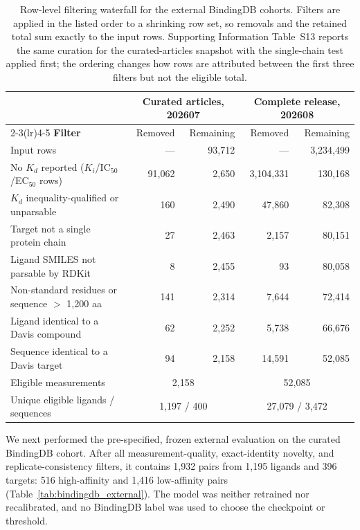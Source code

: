 \documentclass[fleqn,10pt]{wlscirep}
\begin{document}
\begin{table}[htbp]
\centering
\small
\caption{Row-level filtering waterfall for the external BindingDB cohorts.
  Filters are applied in the listed order to a shrinking row set, so removals
  and the retained total sum exactly to the input rows.  Supporting Information
  Table~S13 reports the same curation for the curated-articles snapshot with the
  single-chain test applied first; the ordering changes how rows are attributed
  between the first three filters but not the eligible total.}
\label{tab:bindingdb_curation}
\begin{tabular}{lrrrr}
\toprule
 & \multicolumn{2}{c}{\textbf{Curated articles, 202607}} &
   \multicolumn{2}{c}{\textbf{Complete release, 202608}} \\
\cmidrule(lr){2-3}\cmidrule(lr){4-5}
\textbf{Filter} & Removed & Remaining & Removed & Remaining \\
\midrule
Input rows                                 & ---     & 93{,}712 & ---           & 3{,}234{,}499 \\
No $K_d$ reported ($K_i$/IC$_{50}$/EC$_{50}$ rows) & 91{,}062 & 2{,}650 & 3{,}104{,}331 & 130{,}168 \\
$K_d$ inequality-qualified or unparsable   & 160     & 2{,}490  & 47{,}860      & 82{,}308 \\
Target not a single protein chain          & 27      & 2{,}463  & 2{,}157       & 80{,}151 \\
Ligand SMILES not parsable by RDKit        & 8       & 2{,}455  & 93            & 80{,}058 \\
Non-standard residues or sequence $>$ 1{,}200 aa & 141 & 2{,}314 & 7{,}644      & 72{,}414 \\
Ligand identical to a Davis compound       & 62      & 2{,}252  & 5{,}738       & 66{,}676 \\
Sequence identical to a Davis target       & 94      & 2{,}158  & 14{,}591      & 52{,}085 \\
\midrule
Eligible measurements                      & \multicolumn{2}{c}{2{,}158} & \multicolumn{2}{c}{52{,}085} \\
Unique eligible ligands / sequences        & \multicolumn{2}{c}{1{,}197 / 400} & \multicolumn{2}{c}{27{,}079 / 3{,}472} \\
\bottomrule
\end{tabular}
\end{table}

We next performed the pre-specified, frozen external evaluation on the curated
BindingDB cohort.  After all measurement-quality, exact-identity novelty, and
replicate-consistency filters, it contains 1{,}932 pairs from 1{,}195 ligands
and 396 targets: 516 high-affinity and 1{,}416 low-affinity pairs
(Table~\ref{tab:bindingdb_external}).  The model was neither retrained nor
recalibrated, and no BindingDB label was used to choose the checkpoint or
threshold.
\end{document}
